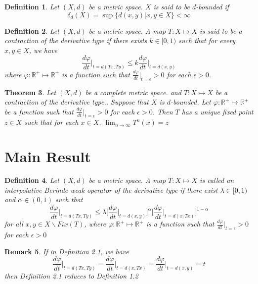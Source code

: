 \documentclass[11pt,letterpaper]{article}
\newtheorem{thm}{Theorem}[section]
\newtheorem{defn}[thm]{Definition}
\newtheorem{rem}[thm]{Remark}
\begin{document}
\begin{defn} \cite{3} Let $(X,d)$ be a metric space. $X$ is said to be $d$-bounded if $$\delta_{d}(X)=\sup \{d(x,y)| x,y\in X\}<\infty$$
\end{defn}

\begin{defn} \cite{3} Let $(X,d)$ be a metric space. A map $T:X\mapsto X$ is said to be a  contraction of the derivative type if there exists $k\in [0,1)$ such that for every $x,y\in X$, we have $$\frac{d\varphi}{dt}\bigg|_{t=d(Tx,Ty)} \leq k \frac{d\varphi}{dt}\bigg|_{t=d(x,y)}$$ where $\varphi:\mathbb{R}^{+}\mapsto \mathbb{R}^{+}$ is a function such that
$\frac{d\varphi}{dt}\bigg|_{t=\epsilon} >0$ for each $\epsilon>0$.
\end{defn}

\begin{thm}\cite{3} Let $(X,d)$ be a complete metric space. and $T:X\mapsto X$ be a contraction of the derivative type.. Suppose that $X$ is $d$-bounded. Let
$\varphi:\mathbb{R}^{+}\mapsto \mathbb{R}^{+}$ be a function such that $\frac{d\varphi}{dt}\bigg|_{t=\epsilon} >0$ for each $\epsilon>0$. Then $T$ has a unique fixed point $z\in X$ such that for each $x\in X$. $\lim_{n\to\infty} T^{n}(x)=z$
\end{thm}



\section{\textbf{Main Result}}

\begin{defn} Let $(X,d)$ be a metric space. A map $T:X\mapsto X$ is called an interpolative Berinde weak operator of the derivative  type if there exist $\lambda \in [0,1)$ and $\alpha \in (0,1)$ such that
$$\frac{d\varphi}{dt}\bigg|_{t=d(Tx,Ty)} \leq \lambda \bigg[\frac{d\varphi}{dt}\bigg|_{t=d(x,y)}\bigg]^{\alpha}  \bigg[\frac{d\varphi}{dt}\bigg|_{t=d(x,Tx)}\bigg]^{1-\alpha}$$ for all $x,y\in X\backslash Fix(T)$, where $\varphi: \mathbb{R}^{+}\mapsto \mathbb{R}^{+}$ is a function such that $\frac{d \varphi}{dt}\bigg|_{t=\epsilon} >0$ for each $\epsilon>0$
\end{defn}


\begin{rem} If in Definition 2.1, we have
$$\frac{d\varphi}{dt}\bigg|_{t=d(Tx,Ty)}=\frac{d\varphi}{dt}\bigg|_{t=d(x,Tx)}=\frac{d\varphi}{dt}\bigg|_{t=d(x,y)}=t$$  then Definition 2.1 reduces to Definition 1.2
\end{rem}
\end{document}

